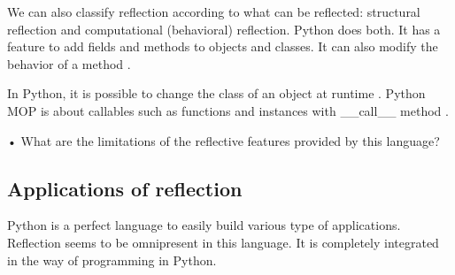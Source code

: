 %
%
%
%
%
%
%
%
%
%
%

We can also classify reflection according to what can be reflected: structural reflection and computational (behavioral) reflection. %
Python does both. It has a feature to add fields and methods to objects and classes. It can also modify the behavior of a method \cite{mendez2011computational}.

In Python, it is possible to change the class of an object at runtime \cite{dynamic_lang_study}. %
Python MOP is about callables such as functions and instances with \_\_call\_\_ method \cite{Russel_MOP}.

•	What are the limitations of the reflective features provided by this language?\\


\subsection{Applications of reflection}

Python is a perfect language to easily build various type of applications. 
Reflection seems to be omnipresent in this language. 
It is completely integrated in the way of programming in Python.\\

